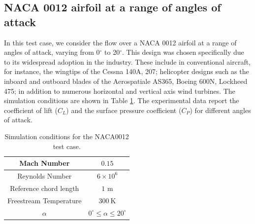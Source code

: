 
\subsection{NACA 0012 airfoil at a range of angles of attack} \label{sec:equips_naca0012}
In this test case, we consider the flow over a NACA 0012 airfoil at a range of angles of attack, varying from 0$^{\circ}$ to 20$^{\circ}$.
This design was chosen specifically due to its widespread adoption in the industry.
These include in conventional aircraft, for instance, the wingtips of the Cessna 140A, 207; helicopter designs such as the inboard and outboard blades of the Aerospatiale AS365, Boeing 600N, Lockheed 475; in addition to numerous horizontal and vertical axis wind turbines.
The simulation conditions are shown in Table \ref{tab:naca0012_cond}.
The experimental data \cite{ladson1988} report the coefficient of lift ($C_L$) and the surface pressure coefficient ($C_P$) for different angles of attack. 

\begin{table}
\centering
    \renewcommand{\arraystretch}{1.2}
    \captionsetup{justification=centering}
    \caption{Simulation conditions for the NACA0012 test case.} 
    \begin{tabular}{|c|c|}
        \hline
        Mach Number & $0.15$ \\ \hline
        Reynolds Number & $6\times10^6$ \\ \hline
        Reference chord length & $1$ m \\ \hline
        Freestream Temperature & $300~\text{K}$ \\ \hline
        $\alpha$ & $0^\circ \leq \alpha \leq 20^\circ$ \\ \hline 
    \end{tabular}
    \label{tab:naca0012_cond}
\end{table}


